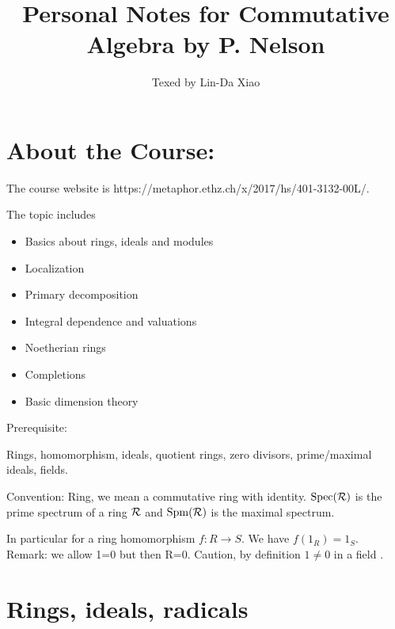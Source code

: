 \documentclass[11pt]{article}
\title{\bf Personal Notes for Commutative Algebra by P. Nelson}
\author{Texed by Lin-Da Xiao} %
\newcommand{\calr}{{\cal R}}
\begin{document}
\maketitle
\tableofcontents
\newpage
\section*{About the Course:}
The course website is https://metaphor.ethz.ch/x/2017/hs/401-3132-00L/. 

The topic includes
\begin{itemize}
\item 
Basics about rings, ideals and modules
\item 
Localization
\item 
Primary decomposition
\item 
Integral dependence and valuations
\item 
Noetherian rings
\item 
Completions
\item 
Basic dimension theory
\end{itemize}

Prerequisite:

Rings, homomorphism, ideals, quotient rings, zero divisors, prime/maximal ideals, fields.

Convention: 
Ring, we mean a commutative ring with identity. $\text{Spec}(\calr)$ is the prime spectrum of a ring $\calr$ and $\text{Spm}(\calr)$ is the maximal spectrum.

In particular for a ring homomorphism $f:R\rightarrow S$. We have $f(1_R)=1_S$.
 
Remark:
we allow 1=0 but then R=0.
Caution, by definition $1\neq 0$ in a field .
\section{Rings, ideals, radicals}
\end{document}
